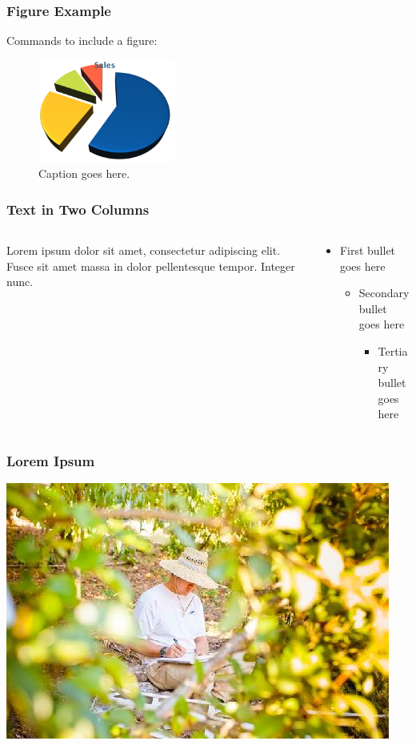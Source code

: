 \documentclass[10pt,xcolor={table,dvipsnames},t]{beamer}
\begin{document}
\begin{frame}
\frametitle{Figure Example}

Commands to include a figure:

\begin{figure}
\includegraphics[width=0.4\textwidth]{chart}
\caption{\label{fig:your-figure}Caption goes here.}
\end{figure}
\end{frame}

\begin{frame}
\frametitle{Text in Two Columns}

\begin{columns}[T]

\begin{column}{0.48\textwidth}
\small
Lorem ipsum dolor sit amet, consectetur adipiscing elit. Fusce sit amet massa in dolor pellentesque tempor. Integer nunc. 
\end{column}

\begin{column}{0.48\textwidth}
\begin{itemize}
\item First bullet goes here
  \begin{itemize}
  \item Secondary bullet goes here
    \begin{itemize}
    \item Tertiary bullet goes here
    \end{itemize}
  \end{itemize}
\end{itemize}
\end{column}

\end{columns}
\end{frame}



\begin{frame}
\frametitle{Lorem Ipsum}

\includegraphics[width=.65\textwidth,height=.5\textheight]{photo}

\end{frame}
\end{document}
